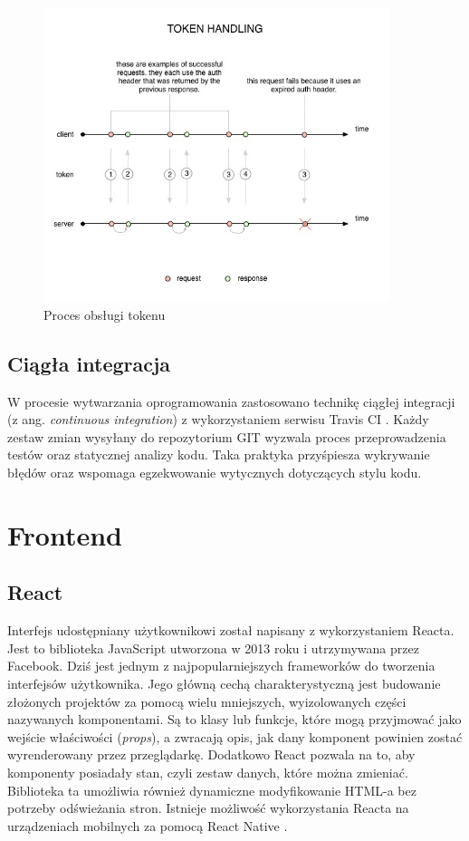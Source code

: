 \documentclass[declaration,shortabstract,polish,inz]{iithesis}
\begin{document}
\begin{figure}[H]
    \centering
    \includegraphics[width=0.9\textwidth]{images/token-update-detail.jpg}
    \caption{Proces obsługi tokenu \cite{token}}
    \label{fig:token}
\end{figure}

\subsection{Ciągła integracja}
W procesie wytwarzania oprogramowania zastosowano technikę ciągłej integracji (z ang. \textit{continuous integration}) \cite{ci} z wykorzystaniem serwisu Travis CI \cite{travis}. Każdy zestaw zmian wysyłany do repozytorium GIT wyzwala proces przeprowadzenia testów oraz statycznej analizy kodu. Taka praktyka przyśpiesza wykrywanie błędów oraz wspomaga egzekwowanie wytycznych dotyczących stylu kodu.

\section{Frontend}

\subsection{React}
Interfejs udostępniany użytkownikowi został napisany z wykorzystaniem Reacta. Jest to biblioteka JavaScript utworzona w 2013 roku \cite{reactwiki} i utrzymywana przez Facebook. Dziś jest jednym z najpopularniejszych frameworków do tworzenia interfejsów użytkownika. Jego główną cechą charakterystyczną jest budowanie złożonych projektów za pomocą wielu mniejszych, wyizolowanych części nazywanych komponentami. Są to klasy lub funkcje, które mogą przyjmować jako wejście właściwości (\textit{props}), a zwracają opis, jak dany komponent powinien zostać wyrenderowany przez przeglądarkę. Dodatkowo React pozwala na to, aby komponenty posiadały stan, czyli zestaw danych, które można zmieniać. Biblioteka ta umożliwia również dynamiczne modyfikowanie HTML-a bez potrzeby odświeżania stron. Istnieje możliwość wykorzystania Reacta na urządzeniach mobilnych za pomocą React Native \cite{reactnative}.
\end{document}
